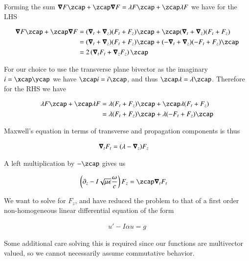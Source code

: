 Forming the sum $\spacegrad F \zcap + \zcap \spacegrad F = \lambda F \zcap + \zcap \lambda F$ we have for the LHS

\begin{align*}
\spacegrad F \zcap + \zcap \spacegrad F 
&= (\spacegrad_t + \spacegrad_z) (F_t + F_z) \zcap + \zcap (\spacegrad_t + \spacegrad_z) (F_t + F_z)  \\
&= (\spacegrad_t + \spacegrad_z) (F_t + F_z) \zcap + (-\spacegrad_t + \spacegrad_z) (-F_t + F_z) \zcap  \\
&= 2 \left( \spacegrad_t F_t + \spacegrad_z F_z \right) \zcap
\end{align*}

For our choice to use the transverse plane bivector as the imaginary $i = \xcap\ycap$ we have $\zcap i = i \zcap$, and thus $\zcap \lambda = \lambda \zcap$.  Therefore for the RHS we have

\begin{align*}
\lambda F \zcap + \zcap \lambda F 
&=
\lambda (F_t + F_z) \zcap + \zcap \lambda (F_t + F_z) \\
&=
\lambda (F_t + F_z) \zcap + \lambda (-F_t + F_z) \zcap \\
\end{align*}

Maxwell's equation in terms of transverse and propagation components is thus

\begin{align}\label{eqn:foo6}
\boldsymbol{\nabla}_t F_t &= (\lambda -\boldsymbol{\nabla}_z) F_z
\end{align}

A left multiplication by $-\zcap$ gives us

\begin{align}\label{eqn:foo7}
\left(\partial_z - I\sqrt{\mu\epsilon}\frac{\omega}{c} \right) F_z &= \zcap \spacegrad_t F_t 
\end{align}

We want to solve for $F_z$, and have reduced the problem to that of a first order non-homogeneous linear differential equation of the form

\begin{align}\label{eqn:foo8}
u' - I \alpha u = g
\end{align}

Some additional care solving this is required since our functions are multivector valued, so we cannot necessarily assume commutative behavior.

\EndArticle
